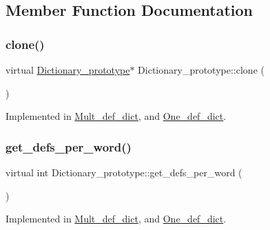 \subsection{Member Function Documentation}
\mbox{\label{class_dictionary__prototype_ac06fe410a511be7ee85ba07cf69b9418}} 
\subsubsection{\texorpdfstring{clone()}{clone()}}
{\footnotesize\ttfamily virtual \mbox{\hyperlink{class_dictionary__prototype}{Dictionary\+\_\+prototype}}$\ast$ Dictionary\+\_\+prototype\+::clone (\begin{DoxyParamCaption}{ }\end{DoxyParamCaption})\hspace{0.3cm}{\ttfamily [pure virtual]}}



Implemented in \mbox{\hyperlink{class_mult__def__dict_ab9f196ca32bb48e465ded573e8484db6}{Mult\+\_\+def\+\_\+dict}}, and \mbox{\hyperlink{class_one__def__dict_a1824ad06343b0c10571c9c34b995d6ee}{One\+\_\+def\+\_\+dict}}.

\mbox{\label{class_dictionary__prototype_a4f9e8f9c02d878faac1021f9c31da736}} 
\subsubsection{\texorpdfstring{get\_defs\_per\_word()}{get\_defs\_per\_word()}}
{\footnotesize\ttfamily virtual int Dictionary\+\_\+prototype\+::get\+\_\+defs\+\_\+per\+\_\+word (\begin{DoxyParamCaption}{ }\end{DoxyParamCaption})\hspace{0.3cm}{\ttfamily [pure virtual]}}



Implemented in \mbox{\hyperlink{class_mult__def__dict_a623909670ca67cedb3f112dfade592c6}{Mult\+\_\+def\+\_\+dict}}, and \mbox{\hyperlink{class_one__def__dict_ab3c5cd3f8f8ae83ebb39d7c8e11627e5}{One\+\_\+def\+\_\+dict}}.

